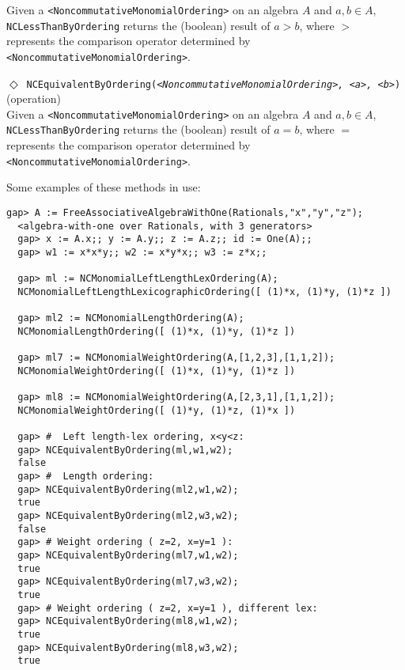 \documentclass[a4paper,11pt]{report}
\begin{document}
{{{ Given a \texttt{{\textless}NoncommutativeMonomialOrdering{\textgreater}} on an algebra $A$ and $a,b \in A$, \texttt{NCLessThanByOrdering} returns the (boolean) result of $a > b$, where $>$ represents the comparison operator determined by \texttt{{\textless}NoncommutativeMonomialOrdering{\textgreater}}. 

 

 \noindent\textcolor{FuncColor}{$\Diamond$\ \texttt{NCEquivalentByOrdering({\slshape {\textless}NoncommutativeMonomialOrdering{\textgreater}, {\textless}a{\textgreater}, {\textless}b{\textgreater}})
\label{NCEquivalentByOrdering}
}\hfill{\scriptsize (operation)}}\\


 Given a \texttt{{\textless}NoncommutativeMonomialOrdering{\textgreater}} on an algebra $A$ and $a,b \in A$, \texttt{NCLessThanByOrdering} returns the (boolean) result of $a = b$, where $=$ represents the comparison operator determined by \texttt{{\textless}NoncommutativeMonomialOrdering{\textgreater}}. 

 Some examples of these methods in use: 
\begin{Verbatim}[fontsize=\small,frame=single,label=Example]
  gap> A := FreeAssociativeAlgebraWithOne(Rationals,"x","y","z");
  <algebra-with-one over Rationals, with 3 generators>
  gap> x := A.x;; y := A.y;; z := A.z;; id := One(A);;
  gap> w1 := x*x*y;; w2 := x*y*x;; w3 := z*x;;
  
  gap> ml := NCMonomialLeftLengthLexOrdering(A);
  NCMonomialLeftLengthLexicographicOrdering([ (1)*x, (1)*y, (1)*z ])
  
  gap> ml2 := NCMonomialLengthOrdering(A);
  NCMonomialLengthOrdering([ (1)*x, (1)*y, (1)*z ])
  
  gap> ml7 := NCMonomialWeightOrdering(A,[1,2,3],[1,1,2]);
  NCMonomialWeightOrdering([ (1)*x, (1)*y, (1)*z ])
  
  gap> ml8 := NCMonomialWeightOrdering(A,[2,3,1],[1,1,2]);
  NCMonomialWeightOrdering([ (1)*y, (1)*z, (1)*x ])
  
  gap> #  Left length-lex ordering, x<y<z:
  gap> NCEquivalentByOrdering(ml,w1,w2);
  false
  gap> #  Length ordering:
  gap> NCEquivalentByOrdering(ml2,w1,w2);
  true
  gap> NCEquivalentByOrdering(ml2,w3,w2);
  false
  gap> # Weight ordering ( z=2, x=y=1 ):
  gap> NCEquivalentByOrdering(ml7,w1,w2);
  true
  gap> NCEquivalentByOrdering(ml7,w3,w2);
  true
  gap> # Weight ordering ( z=2, x=y=1 ), different lex:
  gap> NCEquivalentByOrdering(ml8,w1,w2);
  true
  gap> NCEquivalentByOrdering(ml8,w3,w2);
  true
\end{Verbatim}
 

}}}
\end{document}
